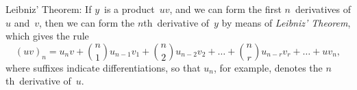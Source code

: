 Leibniz' Theorem: If $y$~is a product~$uv$, and we can form the
first $n$~derivatives of $u$ and~$v$, then we can form the $n$th~derivative of~$y$ by
means of \emph{Leibniz' Theorem}, which gives the rule
\[
(uv)_{n} = u_{n}v
  + \binom{n}{1}u_{n-1}v_{1}
  + \binom{n}{2}u_{n-2}v_{2} + \dots
  + \binom{n}{r}u_{n-r}v_{r} + \dots + uv_{n},
\]
where suffixes indicate differentiations, so that $u_{n}$, for example, denotes the
$n$th~derivative of~$u$. 
